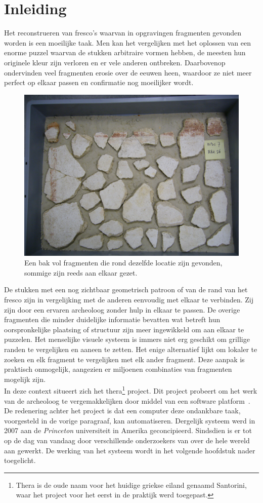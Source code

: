 \chapter{Inleiding}
\label{inleiding}
Het reconstrueren van fresco's waarvan in opgravingen fragmenten gevonden worden is een moeilijke taak. Men kan het vergelijken met het oplossen van een enorme puzzel waarvan de stukken arbitraire vormen hebben, de meesten hun originele kleur zijn verloren en er vele anderen ontbreken. Daarbovenop ondervinden veel fragmenten erosie over de eeuwen heen, waardoor ze niet meer perfect op elkaar passen en confirmatie nog moeilijker wordt.\\

\begin{figure}[ht]
	\begin{center}
		\includegraphics[width=0.6\columnwidth]{images/WDC7_26.JPG}
		\caption{Een bak vol fragmenten die rond dezelfde locatie zijn gevonden, sommige zijn reeds aan elkaar gezet.}
		\label{fig:bakinleiding}
	\end{center}
\end{figure}

De stukken met een nog zichtbaar geometrisch patroon of van de rand van het fresco zijn in vergelijking met de anderen eenvoudig met elkaar te verbinden. Zij zijn door een ervaren archeoloog zonder hulp in elkaar te passen. De overige fragmenten die minder duidelijke informatie bevatten wat betreft hun oorspronkelijke plaatsing of structuur zijn meer ingewikkeld om aan elkaar te puzzelen. Het menselijke visuele systeem is immers niet erg geschikt om grillige randen te vergelijken en aaneen te zetten. Het enige alternatief lijkt om lokaler te zoeken en elk fragment te vergelijken met elk ander fragment. Deze aanpak is praktisch onmogelijk, aangezien er miljoenen combinaties van fragmenten mogelijk zijn.\\

In deze context situeert zich het thera\footnote{Thera is de oude naam voor het huidige griekse eiland genaamd Santorini, waar het project voor het eerst in de praktijk werd toegepast.} project. Dit project probeert om het werk van de archeoloog te vergemakkelijken door middel van een software platform~\cite{Brown2008}. De
redenering achter het project is dat een computer deze ondankbare taak, voorgesteld in de vorige paragraaf, kan automatiseren. Dergelijk systeem werd in 2007 aan de \emph{Princeton} universiteit in Amerika geconcipieerd. Sindsdien is er tot op de dag van vandaag door verschillende onderzoekers van over de hele wereld aan gewerkt. De werking van het systeem wordt in het volgende hoofdstuk nader toegelicht.\\

